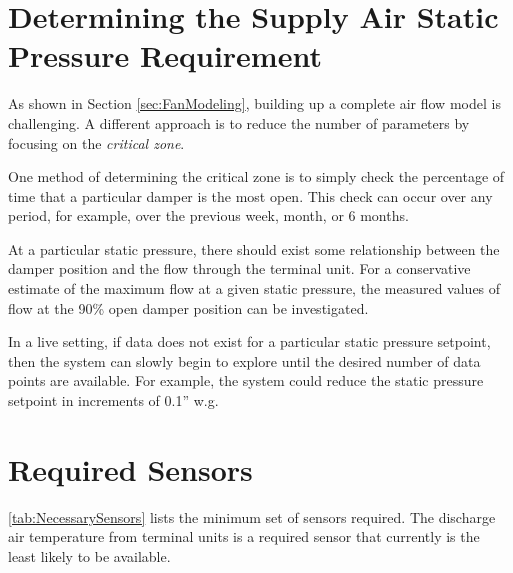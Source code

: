 \section{Determining the Supply Air Static Pressure Requirement}

As shown in Section \ref{sec:FanModeling}, building up a complete air
flow model is challenging. A different approach is to reduce the number
of parameters by focusing on the \textit{critical zone}.

One method of determining the critical zone is to simply check the
percentage of time that a particular damper is the most open. This check
can occur over any period, for example, over the previous week, month,
or 6 months.

At a particular static pressure, there should exist some relationship
between the damper position and the flow through the terminal unit. For
a conservative estimate of the maximum flow at a given static pressure,
the measured values of flow at the 90\% open damper position can be
investigated.

In a live setting, if data does not exist for a particular static
pressure setpoint, then the system can slowly begin to explore until the
desired number of data points are available. For example, the system
could reduce the static pressure setpoint in increments of 0.1'' w.g.

\section{Required Sensors}

\tableref{} \ref{tab:NecessarySensors} lists the minimum set of sensors
required. The discharge air temperature from terminal units is a required
sensor that currently is the least likely to be available.  


